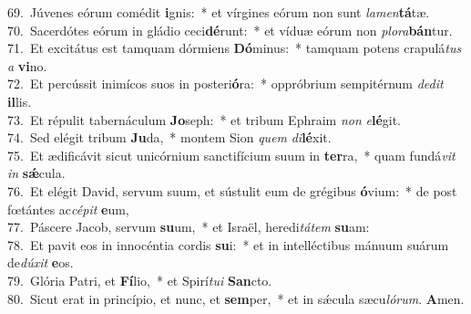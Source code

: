 {69.~}Júvenes eórum comédit \textbf{i}gnis:~* et vírgines eórum non sunt \textit{la}\textit{men}\textbf{tá}tæ.\\
{70.~}Sacerdótes eórum in gládio ceci\textbf{dé}runt:~* et víduæ eórum non \textit{plo}\textit{ra}\textbf{bán}tur.\\
{71.~}Et excitátus est tamquam dórmiens \textbf{Dó}minus:~* tamquam potens crapulá\textit{tus} \textit{a} \textbf{vi}no.\\
{72.~}Et percússit inimícos suos in posteri\textbf{ó}ra:~* oppróbrium sempitérnum \textit{de}\textit{dit} \textbf{il}lis.\\
{73.~}Et répulit tabernáculum \textbf{Jo}seph:~* et tribum Ephraim \textit{non} \textit{e}\textbf{lé}git.\\
{74.~}Sed elégit tribum \textbf{Ju}da,~* montem Sion \textit{quem} \textit{di}\textbf{lé}xit.\\
{75.~}Et ædificávit sicut unicórnium sanctifícium suum in \textbf{ter}ra,~* quam fundá\textit{vit} \textit{in} \textbf{sǽ}cula.\\
{76.~}Et elégit David, servum suum, et sústulit eum de grégibus \textbf{ó}vium:~* de post fœtántes ac\textit{cé}\textit{pit} \textbf{e}um,\\
{77.~}Páscere Jacob, servum \textbf{su}um,~* et Israël, heredi\textit{tá}\textit{tem} \textbf{su}am:\\
{78.~}Et pavit eos in innocéntia cordis \textbf{su}i:~* et in intelléctibus mánuum suárum de\textit{dú}\textit{xit} \textbf{e}os.\\
{79.~}Glória Patri, et \textbf{Fí}lio,~* et Spirí\textit{tu}\textit{i} \textbf{San}cto.\\
{80.~}Sicut erat in princípio, et nunc, et \textbf{sem}per,~* et in sǽcula sæcu\textit{ló}\textit{rum}. \textbf{A}men.\\

